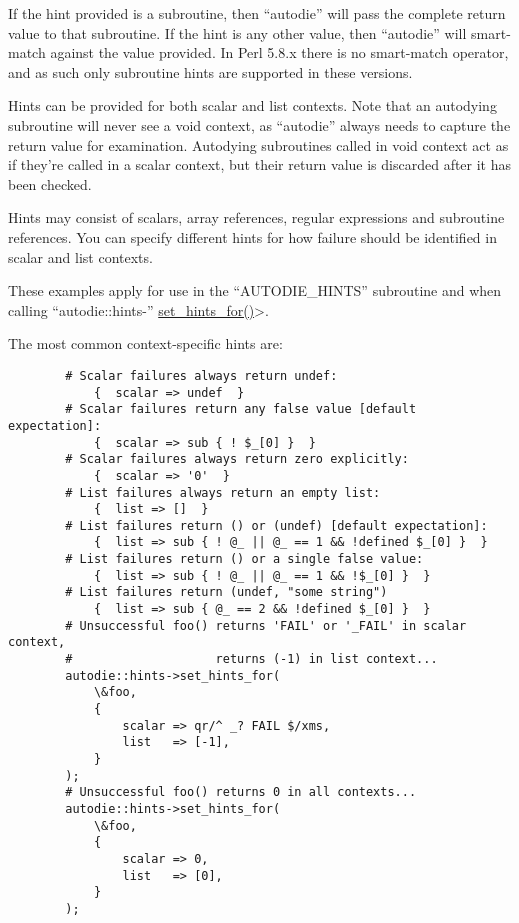 \documentclass[]{article}
\renewcommand{\emph}[1]{\underline{#1}}
\begin{document}
If the hint provided is a subroutine, then ``autodie'' will pass the
complete return value to that subroutine. If the hint is any other
value, then ``autodie'' will smart-match against the value provided. In
Perl 5.8.x there is no smart-match operator, and as such only subroutine
hints are supported in these versions.

Hints can be provided for both scalar and list contexts. Note that an
autodying subroutine will never see a void context, as ``autodie''
always needs to capture the return value for examination. Autodying
subroutines called in void context act as if they're called in a scalar
context, but their return value is discarded after it has been checked.


Hints may consist of scalars, array references, regular expressions and
subroutine references. You can specify different hints for how failure
should be identified in scalar and list contexts.

These examples apply for use in the ``AUTODIE\_HINTS'' subroutine and
when calling ``autodie::hints-'' \emph{set\_hints\_for()}\textgreater{}.

The most common context-specific hints are:

\begin{verbatim}
        # Scalar failures always return undef:
            {  scalar => undef  }
        # Scalar failures return any false value [default expectation]:
            {  scalar => sub { ! $_[0] }  }
        # Scalar failures always return zero explicitly:
            {  scalar => '0'  }
        # List failures always return an empty list:
            {  list => []  }
        # List failures return () or (undef) [default expectation]:
            {  list => sub { ! @_ || @_ == 1 && !defined $_[0] }  }
        # List failures return () or a single false value:
            {  list => sub { ! @_ || @_ == 1 && !$_[0] }  }
        # List failures return (undef, "some string")
            {  list => sub { @_ == 2 && !defined $_[0] }  }
        # Unsuccessful foo() returns 'FAIL' or '_FAIL' in scalar context,
        #                    returns (-1) in list context...
        autodie::hints->set_hints_for(
            \&foo,
            {
                scalar => qr/^ _? FAIL $/xms,
                list   => [-1],
            }
        );
        # Unsuccessful foo() returns 0 in all contexts...
        autodie::hints->set_hints_for(
            \&foo,
            {
                scalar => 0,
                list   => [0],
            }
        );
\end{verbatim}
\end{document}
